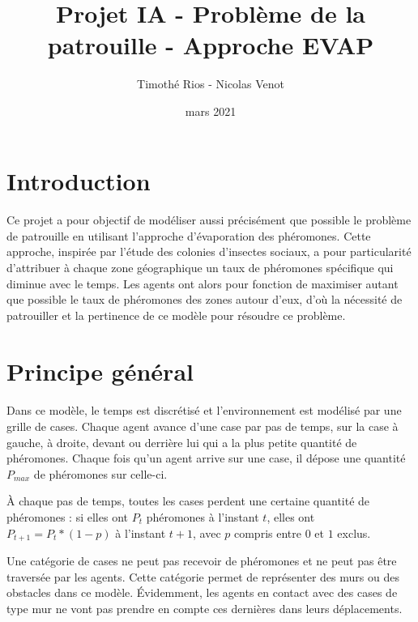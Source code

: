 \documentclass{article}
\title{Projet IA - Problème de la patrouille - Approche EVAP}
\author{Timothé Rios - Nicolas Venot}
\date{mars 2021}
\begin{document}
\maketitle
\newpage
\tableofcontents
\newpage
\setlength{\parindent}{0pt}

\section*{Introduction}
    \paragraph{}Ce projet a pour objectif de modéliser aussi précisément que possible le problème de patrouille 
    en utilisant l'approche d'évaporation des phéromones.
    Cette approche, inspirée par l'étude des colonies d'insectes sociaux, a pour 
    particularité d'attribuer à chaque zone géographique un taux de phéromones spécifique qui diminue avec le temps.
    Les agents ont alors pour fonction de maximiser autant que possible le taux de phéromones 
    des zones autour d'eux, d'où la nécessité de patrouiller et la pertinence de ce modèle pour 
résoudre ce problème.

\section{Principe général}

    \paragraph{} Dans ce modèle, le temps est discrétisé et l'environnement est modélisé par une grille de cases. Chaque agent
    avance d'une case par pas de temps, sur la case à gauche, à droite, devant ou derrière lui qui a la plus petite quantité de 
    phéromones. Chaque fois qu'un agent arrive sur une case, il dépose une quantité $P_{max}$ de phéromones sur celle-ci. 

    À chaque pas de temps, toutes les cases perdent une certaine quantité de phéromones : si elles ont $P_t$ phéromones
    à l'instant $t$, elles ont $P_{t+1} = P_t * (1-p)$ à l'instant $t+1$, avec $p$ compris entre $0$ et $1$ exclus.

    Une catégorie de cases ne peut pas recevoir de phéromones et ne peut pas être traversée par les agents. Cette catégorie permet
    de représenter des murs ou des obstacles dans ce modèle. Évidemment, les agents en contact avec des cases de type mur
    ne vont pas prendre en compte ces dernières dans leurs déplacements.
\end{document}
